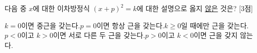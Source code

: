 다음 중 $x$에 대한 이차방정식 $(x+p)^2=k$에 대한 설명으로 옳지 \underline{않은} 것은?  \mbox{[3점]}
\begin{choicesv}{$k=0$이면 중근을 갖는다.}{$p=0$이면 항상 근을 갖는다.}{$k\ge 0$일 때에만 근을 갖는다.}{$p<0$이고 $k>0$이면 서로 다른 두 근을 갖는다.}{$p>0$이고 $k<0$이면 근을 갖지 않는다.}\end{choicesv}
